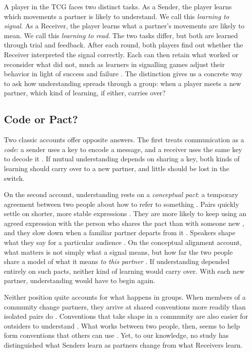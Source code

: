 \documentclass[stu,11pt,floatsintext,donotrepeattitle]{apa7}
\begin{document}
A player in the TCG faces two distinct tasks. As a Sender, the player learns which movements a partner is likely to understand. We call this \emph{learning to signal}. As a Receiver, the player learns what a partner's movements are likely to mean. We call this \emph{learning to read}. The two tasks differ, but both are learned through trial and feedback. After each round, both players find out whether the Receiver interpreted the signal correctly. Each can then retain what worked or reconsider what did not, much as learners in signalling games adjust their behavior in light of success and failure \parencite{skyrms2010}. The distinction gives us a concrete way to ask how understanding spreads through a group: when a player meets a new partner, which kind of learning, if either, carries over?

\subsection{Code or Pact?}

Two classic accounts offer opposite answers. The first treats communication as a \emph{code}: a sender uses a key to encode a message, and a receiver uses the same key to decode it \parencite[as critiqued by][]{stolk2016}. If mutual understanding depends on sharing a key, both kinds of learning should carry over to a new partner, and little should be lost in the switch.

On the second account, understanding rests on a \emph{conceptual pact}: a temporary agreement between two people about how to refer to something \parencite{brennan1996,garrod1987}. Pairs quickly settle on shorter, more stable expressions \parencite{clark1986}. They are more likely to keep using an agreed expression with the person who shares the pact than with someone new \parencite{brennan1996}, and they slow down when a familiar partner departs from it \parencite{metzing2003}. Speakers shape what they say for a particular audience \parencite{clark1982}. On the conceptual alignment account, what matters is not simply what a signal means, but how far the two people share a model of what it means \emph{to this partner} \parencite{stolk2016,stolk2020}. If understanding depended entirely on such pacts, neither kind of learning would carry over. With each new partner, understanding would have to begin again.

Neither position quite accounts for what happens in groups. When members of a community change partners, they arrive at shared conventions more readily than isolated pairs do \parencite{garrod1994,fay2010}. Conventions that take shape in a community are also easier for outsiders to understand \parencite{fay2008}. What works between two people, then, seems to help form conventions that others can use \parencite{hawkins2023}. Yet, to our knowledge, no study has distinguished what Senders learn as partners change from what Receivers learn.
\end{document}

